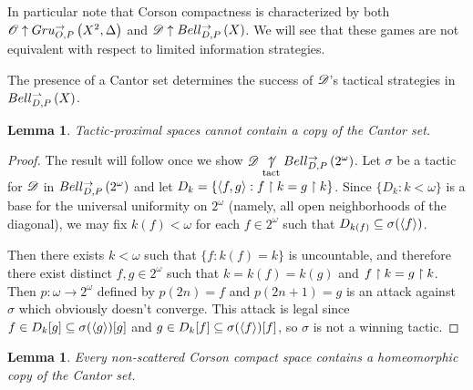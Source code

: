\documentclass{amsart}
\newtheorem{lemma}[theorem]{Lemma}
\theoremstyle{definition}
\begin{document}
  In particular note that Corson compactness is characterized by both
  \(\mathscr{O}\uparrow Gru_{O,P}^{\to}\left({X^2},{\Delta}\right)\) and
  \(\mathscr{D}\uparrow Bell_{D,P}^{\to}\left({X}\right)\). We will see that these games are not
  equivalent with respect to limited information strategies.

  The presence of a Cantor set determines the success of \(\mathscr{D}\)'s
  tactical strategies in \(Bell_{D,P}^{\rightharpoonup}\left({X}\right)\).

  \begin{lemma}
    Tactic-proximal spaces cannot contain a copy of the Cantor set.
  \end{lemma}

  \begin{proof}
    The result will follow once we show
    \(\mathscr{D}\underset{\text{tact}}{\not\uparrow}Bell_{D,P}^{\to}\left({2^\omega}\right)\).
    Let \(\sigma\) be a tactic for \(\mathscr{D}\) in \(Bell_{D,P}^{\to}\left({2^\omega}\right)\)
    and let \(D_k=\{\langle f,g\rangle:f\restriction k = g\restriction k\}\). Since \(\{D_k:k<\omega\}\)
    is a base for the universal uniformity on \(2^\omega\)
    (namely, all open neighborhoods of the diagonal),
    we may fix \(k(f)<\omega\)
    for each \(f\in2^\omega\) such that \(D_{k(f)}\subseteq\sigma(\langle f\rangle)\).

    Then there exists \(k<\omega\) such that \(\{f:k(f)=k\}\) is uncountable,
    and therefore there exist distinct \(f,g\in2^\omega\)
    such that \(k=k(f)=k(g)\) and
    \(f\restriction k=g\restriction k\). Then \(p:\omega\to2^\omega\) defined by
    \(p(2n)=f\) and \(p(2n+1)=g\) is an attack against \(\sigma\) which
    obviously doesn't converge. This attack is legal since
    \(f\in D_k[g]\subseteq\sigma(\langle g\rangle)[g]\) and
    \(g\in D_k[f]\subseteq\sigma(\langle f\rangle)[f]\), so \(\sigma\) is not a winning
    tactic.
  \end{proof}

  \begin{lemma}
    Every non-scattered Corson compact space contains a homeomorphic
    copy of the Cantor set.
  \end{lemma}
\end{document}
